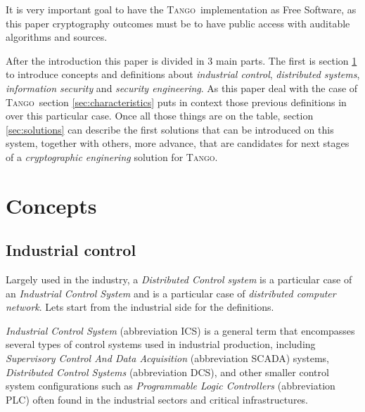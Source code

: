 \documentclass[10pt,a4paper,twoside]{llncs}
\newcommand{\todo}[1]{\texttt{\color{red}TODO:} ``\emph{#1}''}
\newcommand{\tango}{\textsc{Tango}}
\begin{document}
It is very important goal to have the \tango\, implementation as Free Software, as this paper cryptography outcomes must be to have public access with auditable algorithms and sources.


After the introduction this paper is divided in $3$ main parts. The first is section \ref{sec:concepts} to introduce concepts and definitions about \emph{industrial control}, \emph{distributed systems}, \emph{information security} and \emph{security engineering}. As this paper deal with the case of \tango\, section \ref{sec:characteristics} puts in context those previous definitions in over this particular case. Once all those things are on the table, section \ref{sec:solutions} can describe the first solutions that can be introduced on this system, together with others, more advance, that are candidates for next stages of a \emph{cryptographic enginering} solution for \tango.


\section{Concepts}\label{sec:concepts}

\subsection{Industrial control}\label{sec:IndCtrl}

Largely used in the industry, a \emph{Distributed Control system} is a particular case of an \emph{Industrial Control System} and is a particular case of \emph{distributed computer network}. Lets start from the industrial side for the definitions.

\begin{definition}\label{def:ICS}
    \emph{Industrial Control System} (abbreviation ICS) is a general term that encompasses several types of control systems used in industrial production, including \emph{Supervisory Control And Data Acquisition} (abbreviation SCADA) systems, \emph{Distributed Control Systems} (abbreviation DCS), and other smaller control system configurations such as \emph{Programmable Logic Controllers} (abbreviation PLC) often found in the industrial sectors and critical infrastructures.
\end{definition}
\end{document}
